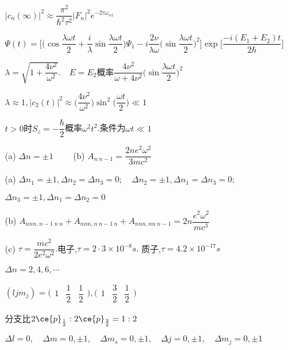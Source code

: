 \achapter

\answer $ |c_{n}(\infty)|^{2}\approx\dfrac{\pi^{2}}{\hbar^{2}\tau^{2}}|F_{n}|^{2}e^{-2\tau\omega_{n1}} $

\answer $ \varPsi(t)=\bigg[\bigg(\cos\dfrac{\lambda\omega t}{2}+\dfrac{i}{\lambda}\sin\dfrac{\lambda\omega t}{2}\bigg)\varPsi_{1}-i\dfrac{2\nu}{\lambda\omega}\bigg(\sin\dfrac{\lambda\omega t}{2}\bigg)^{2}\bigg]\exp\bigg[\dfrac{-i(E_{1}+E_{2})t}{2\hbar}\bigg] $

$ \lambda=\sqrt{1+\dfrac{4\nu^{2}}{\omega^{2}}}.\quad E=E_{2}\text{概率}\dfrac{4\nu^{2}}{\omega+4\nu^{2}}\bigg(\sin\dfrac{\lambda\omega t}{2}\bigg)^{2} $

\answer $ \lambda\approx 1, |c_{2}(t)|^{2}\approx\bigg(\dfrac{4\nu^{2}}{\omega^{2}}\bigg)\sin^{2}\bigg(\dfrac{\omega t}{2}\bigg)\ll 1 $

\answer $ t>0\text{时}S_{z}=-\dfrac{\hbar}{2}$概率$\omega^{2}t^{2}$.条件为$\omega t\ll 1$

\answer (a) $ \Delta n=\pm1 \qquad $	(b) $ A_{n\  n-1}=\dfrac{2n e^{2}\omega^{2}}{3mc^{2}} $

\answer (a) $ \Delta n_{1}=\pm1, \Delta n_{2}=\Delta n_{3}=0;\quad \Delta n_{2}=\pm1,\Delta n_{1}=\Delta n_{3}=0; $

$ \Delta n_{3}=\pm1,\Delta n_{1}=\Delta n_{2}=0 $

(b)	$ A_{nnn,n-1\ n\ n}+A_{nnn,n\  n-1\  n}+A_{nnn,nn\  n-1}=2n\dfrac{e^{2}\omega^{2}}{mc^{3}} $

(c) $ \tau=\dfrac{mc^{2}}{2e^{2}\omega^{2}}.$电子,$\tau=2\cdot 3\times10^{-8}\si{s}.$ 质子,$ \tau=4.2\times 10^{-17}\si{s} $

\answer $ \Delta n=2,4,6,\cdots $


\answer $ (ljm_{j})=\bigg( \begin{smallmatrix}
	\displaystyle{1} & \dfrac{1}{2} & \dfrac{1}{2}
	\end{smallmatrix} \bigg),\bigg(\begin{smallmatrix}
	\displaystyle{1} & \dfrac{3}{2} & \dfrac{1}{2}
	\end{smallmatrix}\bigg) $

	分支比$ 2\ce{p}_{\frac{1}{2}}:2\ce{p}_{\frac{3}{2}}=1:2 $

\answer $ \Delta l=0,\quad \Delta m=0,\pm1,\quad \Delta m_{s}=0,\pm1,\quad \Delta j=0,\pm1,\quad \Delta m_{j}=0,\pm1 $


